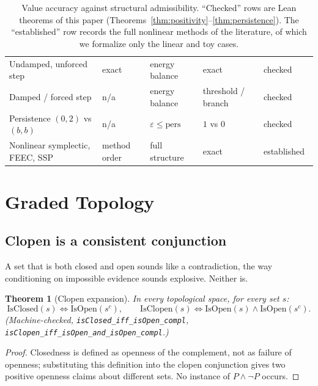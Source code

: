 \documentclass[11pt,a4paper]{article}
\newtheorem{theorem}{Theorem}[section]
\begin{document}
\begin{table}[ht]
\begin{tabular}{@{}lllll@{}}
Undamped, unforced step & exact & energy balance & exact & checked \\
Damped / forced step & n/a & energy balance & threshold / branch & checked \\
Persistence $(0,2)$ vs $(b,b)$ & n/a & $\varepsilon \le \mathrm{pers}$ & $1$ vs $0$ & checked \\
\midrule
Nonlinear symplectic, FEEC, SSP & method order & full structure & exact &
  established~\cite{hairer2006,marsden2001,arnold2006,gottlieb2001} \\
\bottomrule
\end{tabular}
\caption{Value accuracy against structural admissibility.
``Checked'' rows are Lean theorems of this paper
(Theorems~\ref{thm:positivity}--\ref{thm:persistence}).
The ``established'' row records the full nonlinear methods of the
literature, of which we formalize only the linear and toy cases.}
\label{tab:comparison}
\end{table}

\section{Graded Topology}
\label{sec:topology}

\subsection{Clopen is a consistent conjunction}

A set that is both closed and open sounds like a contradiction, the way
conditioning on impossible evidence sounds explosive.
Neither is.

\begin{theorem}[Clopen expansion]
\label{thm:clopen}
In every topological space, for every set $s$:
\[
  \mathrm{IsClosed}(s) \iff \mathrm{IsOpen}(s^{c}),
  \qquad
  \mathrm{IsClopen}(s) \iff
  \mathrm{IsOpen}(s) \wedge \mathrm{IsOpen}(s^{c}).
\]
(Machine-checked, \texttt{isClosed\_iff\_isOpen\_compl},
\texttt{isClopen\_iff\_isOpen\_and\_isOpen\_compl}.)
\end{theorem}
\begin{proof}
Closedness is defined as openness of the complement, not as failure of
openness; substituting this definition into the clopen conjunction
gives two positive openness claims about different sets.
No instance of $P \wedge \neg P$ occurs.
\end{proof}
\end{document}
